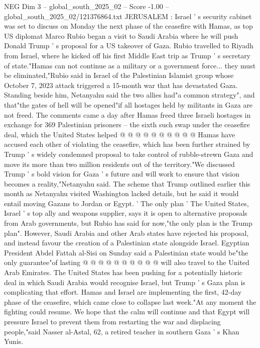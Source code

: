 \begin{textsample}{NEG Dim 3 – global\_south\_2025\_02 – Score -1.00 – global\_south\_2025\_02/121376864.txt}  \label{ex:f3_neg_013}
JERUSALEM : Israel ' s security cabinet was set to discuss on Monday the next phase of the ceasefire with Hamas, as top US diplomat Marco Rubio began a visit to Saudi Arabia where he will push Donald Trump ' s proposal for a US takeover of Gaza.
Rubio travelled to Riyadh from Israel, where he kicked off his first Middle East trip as Trump ' s secretary of state."Hamas can not continue as a military or a government force... they must be eliminated,"Rubio said in Israel of the Palestinian Islamist group whose October 7, 2023 attack triggered a 15-month war that has devastated Gaza.
Standing beside him, Netanyahu said the two allies had"a common strategy", and that"the gates of hell will be opened"if all hostages held by militants in Gaza are not freed.
The comments came a day after Hamas freed three Israeli hostages in exchange for 369 Palestinian prisoners -- the sixth such swap under the ceasefire deal, which the United States helped @ @ @ @ @ @ @ @ @ @ Hamas have accused each other of violating the ceasefire, which has been further strained by Trump ' s widely condemned proposal to take control of rubble-strewn Gaza and move its more than two million residents out of the territory."We discussed Trump ' s bold vision for Gaza ' s future and will work to ensure that vision becomes a reality,"Netanyahu said.
The scheme that Trump outlined earlier this month as Netanyahu visited Washington lacked details, but he said it would entail moving Gazans to Jordan or Egypt. ' The only plan ' The United States, Israel ' s top ally and weapons supplier, says it is open to alternative proposals from Arab governments, but Rubio has said for now,"the only plan is the Trump plan".
However, Saudi Arabia and other Arab states have rejected his proposal, and instead favour the creation of a Palestinian state alongside Israel.
Egyptian President Abdel Fattah al-Sisi on Sunday said a Palestinian state would be"the only guarantee"of lasting @ @ @ @ @ @ @ @ @ @ will also travel to the United Arab Emirates.
The United States has been pushing for a potentially historic deal in which Saudi Arabia would recognise Israel, but Trump ' s Gaza plan is complicating that effort.
Hamas and Israel are implementing the first, 42-day phase of the ceasefire, which came close to collapse last week."At any moment the fighting could resume.
We hope that the calm will continue and that Egypt will pressure Israel to prevent them from restarting the war and displacing people,"said Nasser al-Astal, 62, a retired teacher in southern Gaza ' s Khan Yunis.

\end{textsample}
